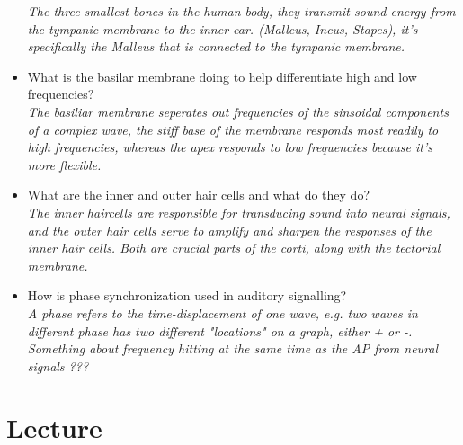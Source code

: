 \documentclass{article}
\begin{document}
\begin{itemize}
    \textit{The three smallest bones in the human body, they transmit sound energy from the tympanic membrane to the inner ear. (Malleus, Incus, Stapes), it's specifically the Malleus that is connected to the tympanic membrane.}
  \item What is the basilar membrane doing to help differentiate high and low frequencies?\\
    \textit{The basiliar membrane seperates out frequencies of the sinsoidal components of a complex wave, the stiff base of the membrane responds most readily to high frequencies, whereas the apex responds to low frequencies because it's more flexible.}
  \item What are the inner and outer hair cells and what do they do?\\
    \textit{The inner haircells are responsible for transducing sound into neural signals, and the outer hair cells serve to amplify and sharpen the responses of the inner hair cells. Both are crucial parts of the corti, along with the tectorial membrane.}
  \item How is phase synchronization used in auditory signalling?\\
    \textit{A phase refers to the time-displacement of one wave, e.g. two waves in different phase has two different "locations" on a graph, either + or -. Something about frequency hitting at the same time as the AP from neural signals ??? }
\end{itemize}

\section{Lecture}
\end{document}
